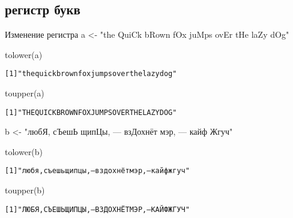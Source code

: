 \subsection{регистр букв}
\begin{frame}{Изменение регистра}
a <- "the QuiCk bRown fOx juMps ovEr tHe laZy dOg"
\begin{itemize}
\mytem tolower(a)
\footnotesize
\begin{alltt}
[1] "the quick brown fox jumps over the lazy dog"
\end{alltt}
\normalsize
\mytem toupper(a)
\footnotesize
\begin{alltt}
[1] "THE QUICK BROWN FOX JUMPS OVER THE LAZY DOG"
\end{alltt}
\normalsize
\end{itemize}
\vfill
b <- "любЯ, сЪешЬ щипЦы, — взДохнёт мэр, — кайф Жгуч{}"
\begin{itemize}
\mytem tolower(b)
\footnotesize
\begin{alltt}
[1] "любя, съешь щипцы, — вздохнёт мэр, — кайф жгуч"
\end{alltt}
\normalsize
\mytem toupper(b)
\footnotesize
\begin{alltt}
[1] "ЛЮБЯ, СЪЕШЬ ЩИПЦЫ, — ВЗДОХНЁТ МЭР, — КАЙФ ЖГУЧ"
\end{alltt}
\normalsize
\end{itemize}
\end{frame}
